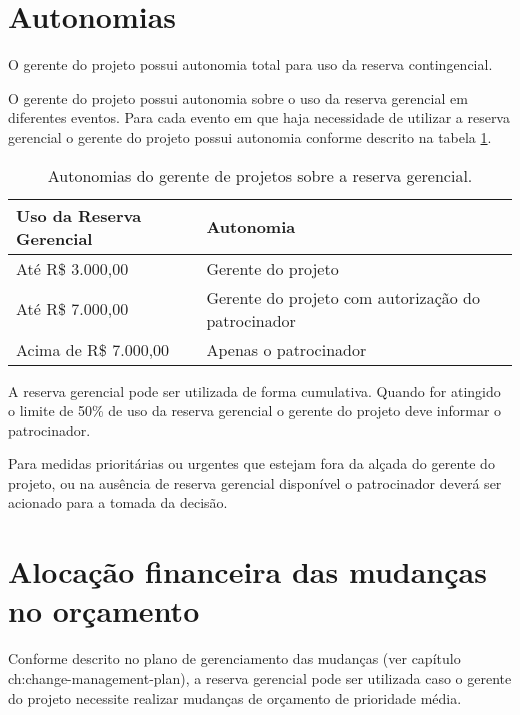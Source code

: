 \section{Autonomias}

O gerente do projeto possui autonomia total para uso da reserva contingencial.

O gerente do projeto possui autonomia sobre o uso da reserva gerencial em diferentes eventos. Para cada evento em que haja necessidade de utilizar a reserva gerencial o gerente do projeto possui autonomia conforme descrito na tabela \ref{tab:project-manager-cost-autonomy}.

\begin{table}[h]
	\centering
	\begin{tabular}{| l | l |}
		\hline
		\textbf{Uso da Reserva Gerencial} & \textbf{Autonomia}                                   \\
		\hline
		Até R\$ 3.000,00                 & Gerente do projeto                                   \\
		\hline
		Até R\$ 7.000,00                 & Gerente do projeto com autorização do patrocinador \\
		\hline
		Acima de R\$ 7.000,00             & Apenas o patrocinador                                \\
		\hline
	\end{tabular}
	\caption{Autonomias do gerente de projetos sobre a reserva gerencial.}
	\label{tab:project-manager-cost-autonomy}
\end{table}

A reserva gerencial pode ser utilizada de forma cumulativa. Quando for atingido o limite de 50\% de uso da reserva gerencial o gerente do projeto deve informar o patrocinador.

Para medidas prioritárias ou urgentes que estejam fora da alçada do gerente do projeto, ou na ausência de reserva gerencial disponível o patrocinador deverá ser acionado para a tomada da decisão.

\section{Alocação financeira das mudanças no orçamento}

Conforme descrito no plano de gerenciamento das mudanças (ver capítulo ch:change-management-plan), a reserva gerencial pode ser utilizada caso o gerente do projeto necessite realizar mudanças de orçamento de prioridade média.


